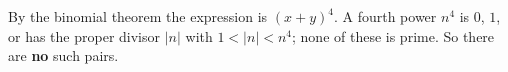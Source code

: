 By the binomial theorem the expression is $(x+y)^4$. A fourth power $n^4$ is $0$, $1$, or has the proper divisor $|n|$ with $1<|n|<n^4$; none of these is prime. So there are \textbf{no} such pairs.
